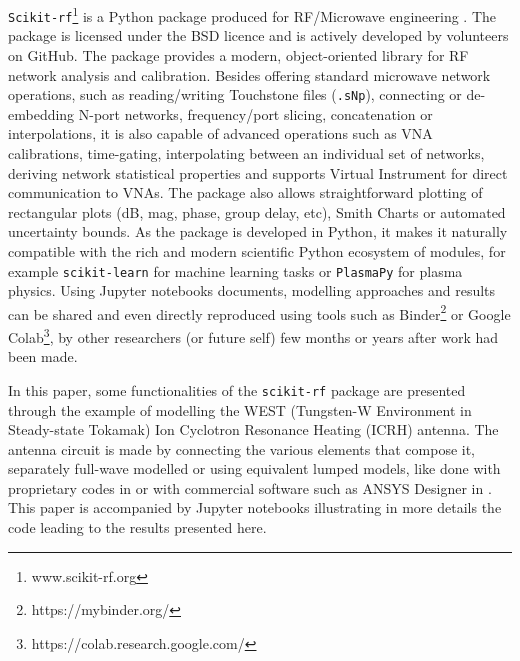 \documentclass{aip-cp}
\begin{document}
	\texttt{Scikit-rf}\footnote{www.scikit-rf.org} is a Python package produced for RF/Microwave engineering  \cite{Arsenovic2018}. The package is licensed under the BSD licence and is actively developed by volunteers on GitHub. The package provides a modern, object-oriented library for RF network analysis and calibration. Besides offering standard microwave network operations, such as reading/writing Touchstone files (\texttt{.sNp}), connecting or de-embedding N-port networks, frequency/port slicing, concatenation or interpolations, it is also capable of advanced operations such as VNA calibrations, time-gating, interpolating between an individual set of networks, deriving network statistical properties and supports Virtual Instrument for direct communication to VNAs. The package also allows straightforward plotting of rectangular plots (dB, mag, phase, group delay, etc), Smith Charts or automated uncertainty bounds. As the package is developed in Python, it makes it naturally compatible with the rich and modern scientific Python ecosystem of modules\cite{Millman2011}, for example  \texttt{scikit-learn} for machine learning tasks \cite{scikit-learn} or \texttt{PlasmaPy} \cite{PlasmaPyCommunity2018} for plasma physics. Using Jupyter notebooks documents\cite{Kluyver2016}, modelling approaches and results can be shared and even directly reproduced using tools such as Binder\footnote{https://mybinder.org/}\cite{project_jupyter-proc-scipy-2018} or Google Colab\footnote{https://colab.research.google.com/}, by other researchers (or future self) few months or years after work had been made.
	
	In this paper, some functionalities of the \texttt{scikit-rf} package are presented through the example of modelling the WEST (Tungsten-W Environment in Steady-state Tokamak) Ion Cyclotron Resonance Heating (ICRH) antenna. The antenna circuit is made by connecting the various elements that compose it, separately full-wave modelled or using equivalent lumped models, like done with proprietary codes in \cite{Durodie2015, Helou2015_SIDON} or with commercial software such as ANSYS Designer in \cite{Hillairet2015}. This paper is accompanied by Jupyter notebooks illustrating in more details the code leading to the results presented here\cite{Hillairet2019_zenodo}.
	
	
	
\end{document}

